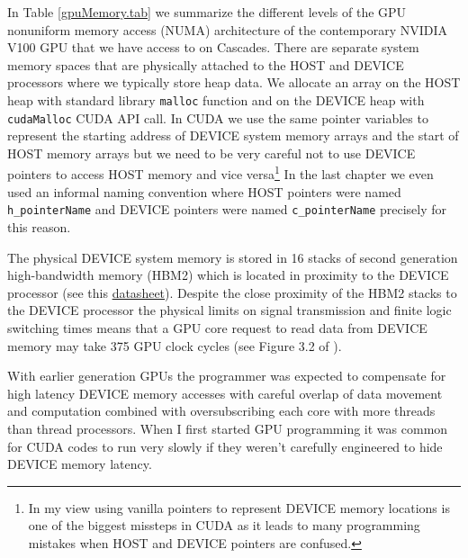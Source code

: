 In Table \ref{gpuMemory.tab} we summarize the different levels of the GPU nonuniform memory access (NUMA) architecture of the contemporary NVIDIA V100 GPU that we have access to on Cascades. There are separate system memory spaces that are physically attached to the HOST and DEVICE processors where we typically store heap data. We allocate an array on the HOST heap with standard library \texttt{malloc} function and on the DEVICE heap with \texttt{cudaMalloc} CUDA API call. In CUDA we use the same pointer variables to represent the starting address of DEVICE system memory arrays and the start of HOST memory arrays but we need to be very careful not to use DEVICE pointers to access HOST memory and vice versa\footnote{In my view using vanilla pointers to represent DEVICE memory locations is one of the biggest missteps in CUDA as it leads to many programming mistakes when HOST and DEVICE pointers are confused.} In the last chapter we even used an informal naming convention where HOST pointers were named \texttt{h\_pointerName} and DEVICE pointers were named \texttt{c\_pointerName} precisely for this reason. 

The physical DEVICE system memory is stored in 16 stacks of second generation high-bandwidth memory (HBM2) which is located in proximity to the DEVICE processor (see this \href{https://images.nvidia.com/content/technologies/volta/pdf/volta-v100-datasheet-update-us-1165301-r5.pdf}{datasheet}). Despite the close proximity of the HBM2 stacks to the DEVICE processor the physical limits on signal transmission and finite logic switching times means that a GPU core request to read data from DEVICE memory may take 375 GPU clock cycles (see Figure 3.2 of \cite{jia2018dissecting}). 

With earlier generation GPUs the programmer was expected to compensate for high latency DEVICE memory accesses with careful overlap of data movement and computation combined with oversubscribing each core with more threads than thread processors. When I first started GPU programming it was common for  CUDA codes to run very slowly if they weren't carefully engineered to hide DEVICE memory latency. 

